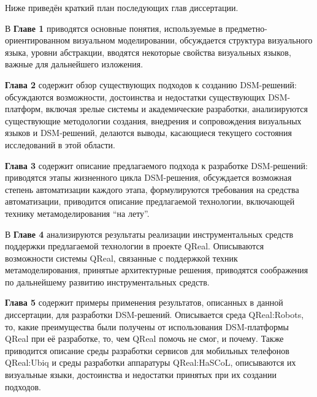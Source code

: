 Ниже приведён краткий план последующих глав диссертации.

В \textbf{Главе 1} приводятся основные понятия, используемые в 
предметно-ориентированном визуальном моделировании, обсуждается структура 
визуального языка, уровни абстракции, вводятся некоторые свойства визуальных 
языков, важные для дальнейшего изложения.

\textbf{Глава 2} содержит обзор существующих подходов к созданию DSM-решений: 
обсуждаются возможности, достоинства и недостатки существующих DSM-платформ, 
включая зрелые системы и академические разработки, анализируются существующие 
методологии создания, внедрения и сопровождения визуальных языков и DSM-решений, 
делаются выводы, касающиеся текущего состояния исследований в этой области.

\textbf{Глава 3} содержит описание предлагаемого подхода к разработке 
DSM-решений: приводятся этапы жизненного цикла DSM-решения, обсуждается 
возможная степень автоматизации каждого этапа, формулируются требования на 
средства автоматизации, приводится описание предлагаемой технологии, включающей 
технику метамоделирования "`на лету"'.

В \textbf{Главе 4} анализируются результаты реализации инструментальных средств 
поддержки предлагаемой технологии в проекте QReal. Описываются возможности 
системы QReal, связанные с поддержкой техник метамоделирования, принятые 
архитектурные решения, приводятся соображения по дальнейшему развитию 
инструментальных средств.

\textbf{Глава 5} содержит примеры применения результатов, описанных в данной 
диссертации, для разработки DSM-решений. Описывается среда QReal:Robots, то, 
какие преимущества были получены от использования DSM-платформы QReal при её 
разработке, то, чем QReal помочь не смог, и почему. Также приводится 
описание среды разработки сервисов для мобильных телефонов QReal:Ubiq и среды
разработки аппаратуры QReal:HaSCoL, описываются их визуальные языки, 
достоинства и недостатки принятых при их создании подходов.
